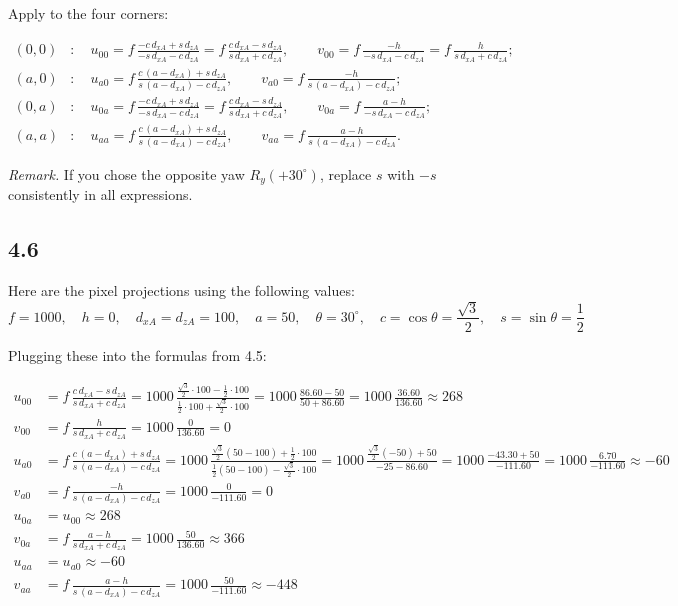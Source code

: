 \documentclass[12pt]{article}
\begin{document}
\noindent Apply to the four corners:

\[
\boxed{
\begin{aligned}
(0,0) &:\quad
u_{00}= f\,\frac{-c\,d_{xA}+s\,d_{zA}}{-s\,d_{xA}-c\,d_{zA}}
= f\,\frac{c\,d_{xA}-s\,d_{zA}}{s\,d_{xA}+c\,d_{zA}},\qquad
v_{00}= f\,\frac{-h}{-s\,d_{xA}-c\,d_{zA}}
= f\,\frac{h}{s\,d_{xA}+c\,d_{zA}};
\\[6pt]
(a,0) &:\quad
u_{a0}= f\,\frac{c\,(a-d_{xA})+s\,d_{zA}}{s\,(a-d_{xA})-c\,d_{zA}},\qquad
v_{a0}= f\,\frac{-h}{s\,(a-d_{xA})-c\,d_{zA}};
\\[6pt]
(0,a) &:\quad
u_{0a}= f\,\frac{-c\,d_{xA}+s\,d_{zA}}{-s\,d_{xA}-c\,d_{zA}}
= f\,\frac{c\,d_{xA}-s\,d_{zA}}{s\,d_{xA}+c\,d_{zA}},\qquad
v_{0a}= f\,\frac{a-h}{-s\,d_{xA}-c\,d_{zA}};
\\[6pt]
(a,a) &:\quad
u_{aa}= f\,\frac{c\,(a-d_{xA})+s\,d_{zA}}{s\,(a-d_{xA})-c\,d_{zA}},\qquad
v_{aa}= f\,\frac{a-h}{s\,(a-d_{xA})-c\,d_{zA}}.
\end{aligned}
}
\]

\textit{Remark.} If you chose the opposite yaw \(R_y(+30^\circ)\), replace \(s\) with \(-s\) consistently in all expressions.
\subsection*{4.6}
Here are the pixel projections using the following values:
\[
f = 1000,\quad h = 0,\quad d_{xA} = d_{zA} = 100,\quad a = 50,\quad \theta = 30^\circ,\quad c = \cos\theta = \frac{\sqrt{3}}{2},\quad s = \sin\theta = \frac{1}{2}
\]

Plugging these into the formulas from 4.5:

\[
\begin{aligned}
u_{00} &= f\,\frac{c\,d_{xA} - s\,d_{zA}}{s\,d_{xA} + c\,d_{zA}}
= 1000\,\frac{\frac{\sqrt{3}}{2}\cdot 100 - \frac{1}{2}\cdot 100}{\frac{1}{2}\cdot 100 + \frac{\sqrt{3}}{2}\cdot 100}
= 1000\,\frac{86.60 - 50}{50 + 86.60}
= 1000\,\frac{36.60}{136.60}
\approx 268 \\
v_{00} &= f\,\frac{h}{s\,d_{xA} + c\,d_{zA}}
= 1000\,\frac{0}{136.60}
= 0 \\[10pt]
u_{a0} &= f\,\frac{c\,(a-d_{xA}) + s\,d_{zA}}{s\,(a-d_{xA}) - c\,d_{zA}}
= 1000\,\frac{\frac{\sqrt{3}}{2}(50-100) + \frac{1}{2}\cdot 100}{\frac{1}{2}(50-100) - \frac{\sqrt{3}}{2}\cdot 100}
= 1000\,\frac{\frac{\sqrt{3}}{2}(-50) + 50}{-25 - 86.60}
= 1000\,\frac{-43.30 + 50}{-111.60}
= 1000\,\frac{6.70}{-111.60}
\approx -60 \\ 
v_{a0} &= f\,\frac{-h}{s\,(a-d_{xA}) - c\,d_{zA}}
= 1000\,\frac{0}{-111.60}
= 0 \\[10pt]
u_{0a} &= u_{00} \approx 268 \\
v_{0a} &= f\,\frac{a-h}{s\,d_{xA} + c\,d_{zA}}
= 1000\,\frac{50}{136.60}
\approx 366 \\[10pt]
u_{aa} &= u_{a0} \approx -60 \\
v_{aa} &= f\,\frac{a-h}{s\,(a-d_{xA}) - c\,d_{zA}}
= 1000\,\frac{50}{-111.60}
\approx -448
\end{aligned}
\]
\end{document}
